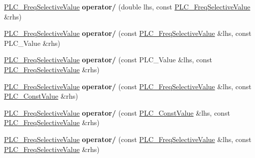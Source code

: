 \begin{DoxyCompactItemize}
\item 
\hypertarget{classns3_1_1PLC__FreqSelectiveValue_a1901dc8118e8a4bfb5520d8222cf8789}{\hyperlink{classns3_1_1PLC__FreqSelectiveValue}{\-P\-L\-C\-\_\-\-Freq\-Selective\-Value} {\bfseries operator/} (double lhs, const \hyperlink{classns3_1_1PLC__FreqSelectiveValue}{\-P\-L\-C\-\_\-\-Freq\-Selective\-Value} \&rhs)}\label{classns3_1_1PLC__FreqSelectiveValue_a1901dc8118e8a4bfb5520d8222cf8789}

\item 
\hypertarget{classns3_1_1PLC__FreqSelectiveValue_acae99c64e3b54c49a0c37091045cbbe2}{\hyperlink{classns3_1_1PLC__FreqSelectiveValue}{\-P\-L\-C\-\_\-\-Freq\-Selective\-Value} {\bfseries operator/} (const \hyperlink{classns3_1_1PLC__FreqSelectiveValue}{\-P\-L\-C\-\_\-\-Freq\-Selective\-Value} \&lhs, const \-P\-L\-C\-\_\-\-Value \&rhs)}\label{classns3_1_1PLC__FreqSelectiveValue_acae99c64e3b54c49a0c37091045cbbe2}

\item 
\hypertarget{classns3_1_1PLC__FreqSelectiveValue_a381dd860610be36daefe607c5ea57aa0}{\hyperlink{classns3_1_1PLC__FreqSelectiveValue}{\-P\-L\-C\-\_\-\-Freq\-Selective\-Value} {\bfseries operator/} (const \-P\-L\-C\-\_\-\-Value \&lhs, const \hyperlink{classns3_1_1PLC__FreqSelectiveValue}{\-P\-L\-C\-\_\-\-Freq\-Selective\-Value} \&rhs)}\label{classns3_1_1PLC__FreqSelectiveValue_a381dd860610be36daefe607c5ea57aa0}

\item 
\hypertarget{classns3_1_1PLC__FreqSelectiveValue_a36a5a366c7818cd7b3ac067e84a59685}{\hyperlink{classns3_1_1PLC__FreqSelectiveValue}{\-P\-L\-C\-\_\-\-Freq\-Selective\-Value} {\bfseries operator/} (const \hyperlink{classns3_1_1PLC__FreqSelectiveValue}{\-P\-L\-C\-\_\-\-Freq\-Selective\-Value} \&lhs, const \hyperlink{classns3_1_1PLC__ConstValue}{\-P\-L\-C\-\_\-\-Const\-Value} \&rhs)}\label{classns3_1_1PLC__FreqSelectiveValue_a36a5a366c7818cd7b3ac067e84a59685}

\item 
\hypertarget{classns3_1_1PLC__FreqSelectiveValue_a86a0696c5c77313627b0c95276cc6761}{\hyperlink{classns3_1_1PLC__FreqSelectiveValue}{\-P\-L\-C\-\_\-\-Freq\-Selective\-Value} {\bfseries operator/} (const \hyperlink{classns3_1_1PLC__ConstValue}{\-P\-L\-C\-\_\-\-Const\-Value} \&lhs, const \hyperlink{classns3_1_1PLC__FreqSelectiveValue}{\-P\-L\-C\-\_\-\-Freq\-Selective\-Value} \&rhs)}\label{classns3_1_1PLC__FreqSelectiveValue_a86a0696c5c77313627b0c95276cc6761}

\item 
\hypertarget{classns3_1_1PLC__FreqSelectiveValue_a23f9fe7f15c537850e07161166947b34}{\hyperlink{classns3_1_1PLC__FreqSelectiveValue}{\-P\-L\-C\-\_\-\-Freq\-Selective\-Value} {\bfseries operator/} (const \hyperlink{classns3_1_1PLC__FreqSelectiveValue}{\-P\-L\-C\-\_\-\-Freq\-Selective\-Value} \&lhs, const \hyperlink{classns3_1_1PLC__FreqSelectiveValue}{\-P\-L\-C\-\_\-\-Freq\-Selective\-Value} \&rhs)}\label{classns3_1_1PLC__FreqSelectiveValue_a23f9fe7f15c537850e07161166947b34}


\end{DoxyCompactItemize}

